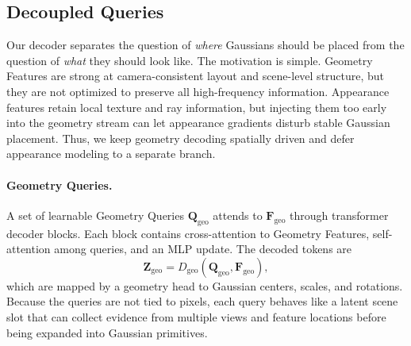 \documentclass[letterpaper]{article} %
\begin{document}
\subsection{Decoupled Queries}
\label{sec:decoupled_queries}

Our decoder separates the question of \emph{where} Gaussians should be placed from the question of \emph{what} they should look like. The motivation is simple. Geometry Features are strong at camera-consistent layout and scene-level structure, but they are not optimized to preserve all high-frequency information. Appearance features retain local texture and ray information, but injecting them too early into the geometry stream can let appearance gradients disturb stable Gaussian placement. Thus, we keep geometry decoding spatially driven and defer appearance modeling to a separate branch.

\paragraph{Geometry Queries.}
A set of learnable Geometry Queries $\mathbf{Q}_{\mathrm{geo}}$ attends to $\mathbf{F}_{\mathrm{geo}}$ through transformer decoder blocks. Each block contains cross-attention to Geometry Features, self-attention among queries, and an MLP update. The decoded tokens are
\begin{equation}
    \mathbf{Z}_{\mathrm{geo}}=D_{\mathrm{geo}}(\mathbf{Q}_{\mathrm{geo}},\mathbf{F}_{\mathrm{geo}}),
\end{equation}
which are mapped by a geometry head to Gaussian centers, scales, and rotations. Because the queries are not tied to pixels, each query behaves like a latent scene slot that can collect evidence from multiple views and feature locations before being expanded into Gaussian primitives.
\end{document}
